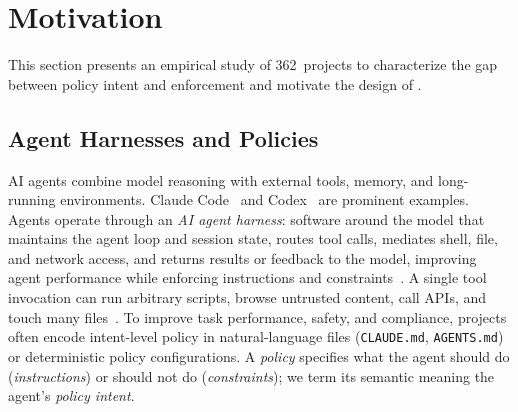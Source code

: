 \section{Motivation}
\label{sec:motivation}

This section presents an empirical study of 362~projects to characterize the gap between policy intent and enforcement and motivate the design of \sys{}.

\subsection{Agent Harnesses and Policies}
\label{sec:background}

AI agents combine model reasoning with external tools, memory, and long-running environments. Claude Code~\cite{anthropic2025claudecode} and Codex~\cite{openai2025codex} are prominent examples.
Agents operate through an \emph{AI agent harness}: software around the model that maintains the agent loop and session state, routes tool calls, mediates shell, file, and network access, and returns results or feedback to the model, improving agent performance while enforcing instructions and constraints~\cite{langchain-harness,fowler-harness}.
A single tool invocation can run arbitrary scripts, browse untrusted content, call APIs, and touch many files~\cite{debenedetti2024agentdojo,zhan2024injecagent,chennabasappa2025llamafirewall}.
To improve task performance, safety, and compliance, projects often encode intent-level policy in natural-language files (\texttt{CLAUDE.md}, \texttt{AGENTS.md})~\cite{chatlatanagulchai2025manifests,santos2025claudeconfig,lulla2026agentsmd} or deterministic policy configurations.
A \emph{policy} specifies what the agent should do (\emph{instructions}) or should not do (\emph{constraints}); we term its semantic meaning the agent's \emph{policy intent}.

